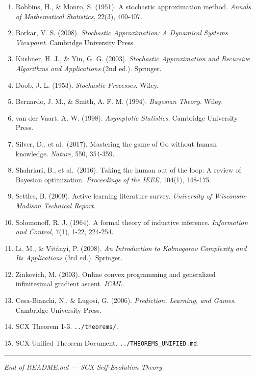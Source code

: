 \documentclass[
  12pt,
]{article}
\providecommand{\tightlist}{%
  \setlength{\itemsep}{0pt}\setlength{\parskip}{0pt}}
\begin{document}
\begin{enumerate}
\def\labelenumi{\arabic{enumi}.}
\tightlist
\item
  Robbins, H., \& Monro, S. (1951). A stochastic approximation method.
  \emph{Annals of Mathematical Statistics}, 22(3), 400-407.
\item
  Borkar, V. S. (2008). \emph{Stochastic Approximation: A Dynamical
  Systems Viewpoint}. Cambridge University Press.
\item
  Kushner, H. J., \& Yin, G. G. (2003). \emph{Stochastic Approximation
  and Recursive Algorithms and Applications} (2nd ed.). Springer.
\item
  Doob, J. L. (1953). \emph{Stochastic Processes}. Wiley.
\item
  Bernardo, J. M., \& Smith, A. F. M. (1994). \emph{Bayesian Theory}.
  Wiley.
\item
  van der Vaart, A. W. (1998). \emph{Asymptotic Statistics}. Cambridge
  University Press.
\item
  Silver, D., et al.~(2017). Mastering the game of Go without human
  knowledge. \emph{Nature}, 550, 354-359.
\item
  Shahriari, B., et al.~(2016). Taking the human out of the loop: A
  review of Bayesian optimization. \emph{Proceedings of the IEEE},
  104(1), 148-175.
\item
  Settles, B. (2009). Active learning literature survey.
  \emph{University of Wisconsin-Madison Technical Report}.
\item
  Solomonoff, R. J. (1964). A formal theory of inductive inference.
  \emph{Information and Control}, 7(1), 1-22, 224-254.
\item
  Li, M., \& Vit\'{a}nyi, P. (2008). \emph{An Introduction to Kolmogorov
  Complexity and Its Applications} (3rd ed.). Springer.
\item
  Zinkevich, M. (2003). Online convex programming and generalized
  infinitesimal gradient ascent. \emph{ICML}.
\item
  Cesa-Bianchi, N., \& Lugosi, G. (2006). \emph{Prediction, Learning,
  and Games}. Cambridge University Press.
\item
  SCX Theorem 1-3. \texttt{../theorems/}.
\item
  SCX Unified Theorem Document. \texttt{../THEOREMS\_UNIFIED.md}.
\end{enumerate}

\begin{center}\rule{0.5\linewidth}{0.5pt}\end{center}

\emph{End of README.md --- SCX Self-Evolution Theory}
\end{document}
